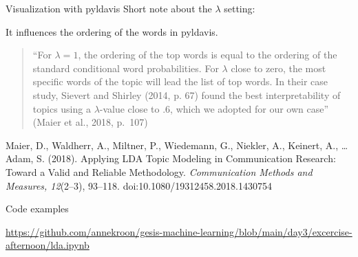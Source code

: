 \documentclass[compress]{beamer}
\begin{document}

\begin{frame}{Visualization with pyldavis}
	Short note about the $\lambda$ setting:
	
	It influences the ordering of the words in pyldavis.
	
	\begin{quote}
		``For $\lambda = 1$, the ordering of the top words is equal to the ordering of the standard conditional word probabilities. For $\lambda$ close to zero, the most specific words of the topic will lead the list of top words. In their case study, Sievert and Shirley (2014, p. 67) found the best interpretability of topics using a  $\lambda$-value close to .6, which we adopted for our own case'' (Maier et al., 2018, p.~107)
	\end{quote}
	
	
	\tiny{Maier, D., Waldherr, A., Miltner, P., Wiedemann, G., Niekler, A., Keinert, A., \ldots Adam, S. (2018). Applying LDA Topic Modeling in Communication Research: Toward a Valid and Reliable Methodology. \textit{Communication Methods and Measures, 12}(2--3), 93--118. doi:10.1080/19312458.2018.1430754}
\end{frame}

\begin{frame}[plain]{Code examples}
	
	
	\url{https://github.com/annekroon/gesis-machine-learning/blob/main/day3/excercise-afternoon/lda.ipynb}
\end{frame}
\end{document}
